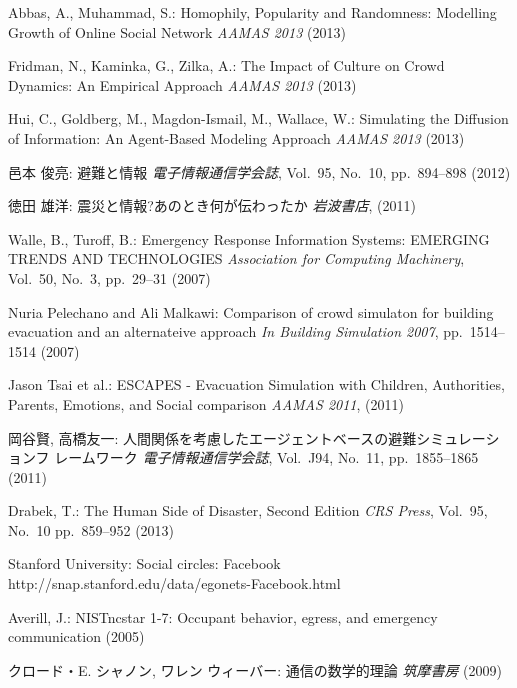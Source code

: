 \documentclass[a4j]{jarticle}
\begin{document}
\begin{thebibliography}{99}

{{Abbas, A.}, {Muhammad, S.}}:
{Homophily, Popularity and Randomness: Modelling Growth of Online Social Network}
{\it AAMAS 2013} (2013)

{{Fridman, N.}, {Kaminka, G.}, {Zilka, A.}}:
{The Impact of Culture on Crowd Dynamics: An Empirical Approach}
{\it AAMAS 2013} (2013)

{{Hui, C.}, {Goldberg, M.}, {Magdon-Ismail, M.}, {Wallace, W.}}:
{Simulating the Diffusion of Information: An Agent-Based Modeling Approach}
{\it AAMAS 2013} (2013)

邑本 俊亮:
避難と情報
{\it 電子情報通信学会誌}, Vol.~95, No.~10, pp.~894--898 (2012)

徳田 雄洋:
震災と情報?あのとき何が伝わったか
{\it 岩波書店}, (2011)

{Walle, B.}, {Turoff, B.}:
{Emergency Response Information Systems: EMERGING TRENDS AND TECHNOLOGIES}
{\it Association for Computing Machinery}, Vol.~50, No.~3, pp.~29--31 (2007)

Nuria Pelechano and Ali Malkawi:
Comparison of crowd simulaton for building evacuation and an alternateive approach
{\it In Building Simulation 2007}, pp.~1514--1514 (2007)

Jason Tsai et al.:
{{ESCAPES} - Evacuation Simulation with Children, Authorities, Parents, Emotions, and Social comparison}
{\it AAMAS 2011}, (2011)

岡谷賢, 高橋友一:
人間関係を考慮したエージェントベースの避難シミュレーションフ レームワーク
{\it 電子情報通信学会誌}, Vol.~J94, No.~11, pp.~1855--1865 (2011)

Drabek, T.:
The Human Side of Disaster, Second Edition
{\it CRS Press}, Vol.~95, No.~10 pp.~859--952 (2013)

Stanford University:
Social circles: Facebook
{http://snap.stanford.edu/data/egonets-Facebook.html}

Averill, J.:
NISTncstar 1-7: Occupant behavior, egress, and emergency communication
(2005)

クロード・E. シャノン, ワレン ウィーバー:
通信の数学的理論
{\it 筑摩書房} (2009)

\end{thebibliography}
\end{document}
